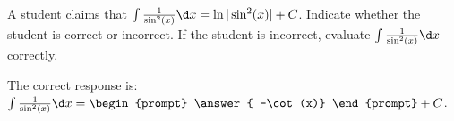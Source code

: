 \documentclass{ximera}
\author{Jim Talamo}
\begin{document}
\begin{exercise}
A student claims that $\int \frac{1}{\sin^2(x)} \d x = \ln|\sin^2(x)|+C$.  Indicate whether the student is correct or incorrect.  If the student is incorrect, evaluate $\int \frac{1}{\sin^2(x)} \d x $ correctly.

\begin{multipleChoice}  

The correct response is: $\int \frac{1}{\sin^2(x)} \d x = \begin{prompt} \answer{ -\cot(x)} \end{prompt} +C$.
\end{multipleChoice}


\end{exercise}
\end{document}
